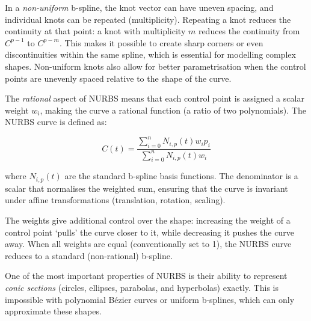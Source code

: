 In a \emph{non-uniform} b-spline, the knot vector can have uneven spacing, and individual knots can be repeated (multiplicity).
Repeating a knot reduces the continuity at that point: a knot with multiplicity \(m\) reduces the continuity from \(C^{p-1}\) to \(C^{p-m}\).
This makes it possible to create sharp corners or even discontinuities within the same spline, which is essential for modelling complex shapes.
Non-uniform knots also allow for better parametrisation when the control points are unevenly spaced relative to the shape of the curve.

The \emph{rational} aspect of NURBS means that each control point is assigned a scalar weight \(w_i\), making the curve a rational function (a ratio of two polynomials).
The NURBS curve is defined as:

\begin{equation}
\label{eq:nurbscurve}
C(t) = \frac{\sum_{i=0}^n N_{i,p}(t) w_i p_i}{\sum_{i=0}^n N_{i,p}(t) w_i}
\end{equation}

where \(N_{i,p}(t)\) are the standard b-spline basis functions.
The denominator is a scalar that normalises the weighted sum, ensuring that the curve is invariant under affine transformations (translation, rotation, scaling).

The weights give additional control over the shape: increasing the weight of a control point `pulls' the curve closer to it, while decreasing it pushes the curve away.
When all weights are equal (conventionally set to 1), the NURBS curve reduces to a standard (non-rational) b-spline.

One of the most important properties of NURBS is their ability to represent \emph{conic sections} (circles, ellipses, parabolas, and hyperbolas) exactly.
This is impossible with polynomial B\'ezier curves or uniform b-splines, which can only approximate these shapes.

